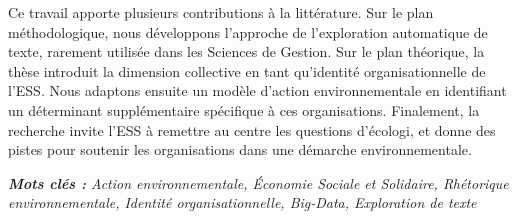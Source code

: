 Ce travail apporte plusieurs contributions à la littérature. Sur le plan méthodologique, nous développons l'approche de l'exploration automatique de texte, rarement utilisée dans les Sciences de Gestion. Sur le plan théorique, la thèse introduit la dimension collective en tant qu'identité organisationnelle de l'ESS. Nous adaptons ensuite un modèle d'action environnementale en identifiant un déterminant supplémentaire spécifique à ces organisations. Finalement, la recherche invite l'ESS à remettre au centre les questions d'écologi, et donne des pistes pour soutenir les organisations dans une démarche environnementale. \\

\vspace{1cm}


\textit{\textbf{Mots clés :} Action environnementale, Économie Sociale et Solidaire, Rhétorique environnementale, Identité organisationnelle, Big-Data, Exploration de texte}

